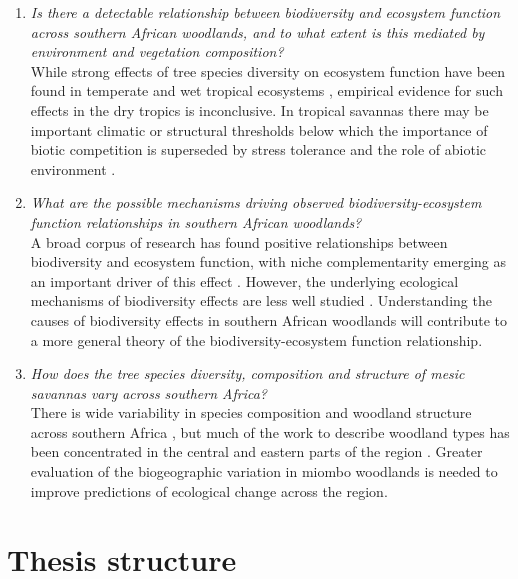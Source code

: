 \begin{refsection}
\begin{enumerate}
\item{\textit{Is there a detectable relationship between biodiversity and ecosystem function across southern African woodlands, and to what extent is this mediated by environment and vegetation composition?} \\ While strong effects of tree species diversity on ecosystem function have been found in temperate and wet tropical ecosystems \citep{Liang2016}, empirical evidence for such effects in the dry tropics is inconclusive. In tropical savannas there may be important climatic or structural thresholds below which the importance of biotic competition is superseded by stress tolerance and the role of abiotic environment \citep{Loiola2015, Mensah2020}.}
\item{\textit{What are the possible mechanisms driving observed biodiversity-ecosystem function relationships in southern African woodlands?} \\ A broad corpus of research has found positive relationships between biodiversity and ecosystem function, with niche complementarity emerging as an important driver of this effect \citep{Plas2019}.  However, the underlying ecological mechanisms of biodiversity effects are less well studied \citep{Barry2019}. Understanding the causes of biodiversity effects in southern African woodlands will contribute to a more general theory of the biodiversity-ecosystem function relationship.}
\item{\textit{How does the tree species diversity, composition and structure of mesic savannas vary across southern Africa?} \\ There is wide variability in species composition and woodland structure across southern Africa \citep{Solbrig1996, White1983}, but much of the work to describe woodland types has been concentrated in the central and eastern parts of the region \citep{Ryan2020}. Greater evaluation of the biogeographic variation in miombo woodlands is needed to improve predictions of ecological change across the region.}
\end{enumerate}

\section{Thesis structure}
\label{intro:sec:struc}


\end{refsection}
